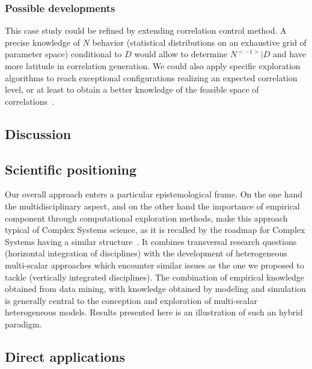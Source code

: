 \subsubsection{Possible developments}


This case study could be refined by extending correlation control method. A precise knowledge of $N$ behavior (statistical distributions on an exhaustive grid of parameter space) conditional to $D$ would allow to determine $N^{<-1>} | D$ and have more latitude in correlation generation. We could also apply specific exploration algorithms to reach exceptional configurations realizing an expected correlation level, or at least to obtain a better knowledge of the feasible space of correlations~\cite{10.1371/journal.pone.0138212}.




\subsection{Discussion}



\subsection*{Scientific positioning}


Our overall approach enters a particular epistemological frame. On the one hand the multidisciplinary aspect, and on the other hand the importance of empirical component through computational exploration methods, make this approach typical of Complex Systems science, as it is recalled by the roadmap for Complex Systems having a similar structure~\cite{2009arXiv0907.2221B}. It combines transversal research questions (horizontal integration of disciplines) with the development of heterogeneous multi-scalar approaches which encounter similar issues as the one we proposed to tackle (vertically integrated disciplines). The combination of empirical knowledge obtained from data mining, with knowledge obtained by modeling and simulation is generally central to the conception and exploration of multi-scalar heterogeneous models. Results presented here is an illustration of such an hybrid paradigm.




\subsection*{Direct applications}


